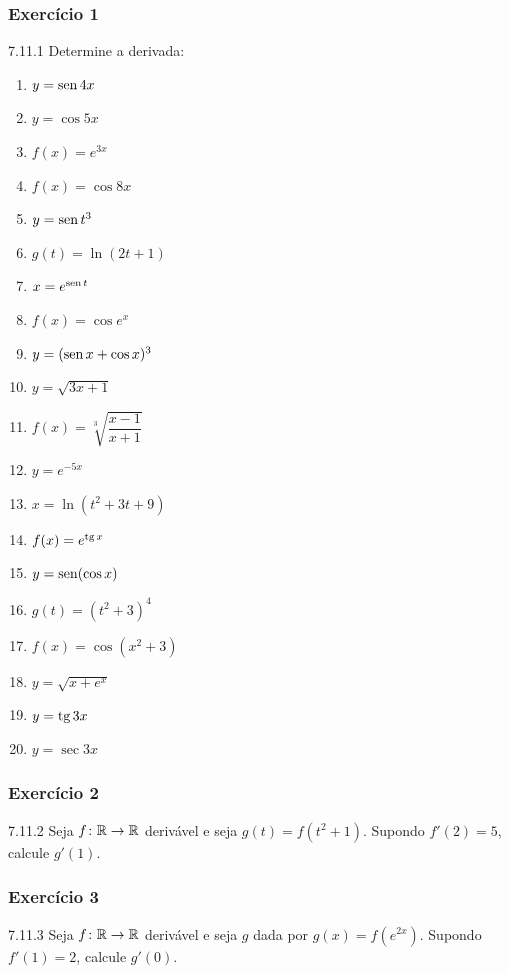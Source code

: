 \subsubsection*{Exercício 1}
\begin{exercicio}[1]{7.11.1}
Determine a derivada:
\begin{enumerate}[label=\alph*)]
    \item $y = \operatorname{sen} 4x$
    \item $y = \cos 5x$
    \item $f(x) = e^{3x}$
    \item $f(x) = \cos 8x$
    \item $y = \operatorname{sen} t^3$
    \item $g(t) = \ln(2t + 1)$
    \item $x = e^{\operatorname{sen} t}$
    \item $f(x) = \cos e^x$
    \item $y = (\operatorname{sen} x + \cos x)^3$
    \item $y = \sqrt{3x + 1}$
    \item $f(x) = \sqrt[3]{\dfrac{x - 1}{x + 1}}$
    \item $y = e^{-5x}$
    \item $x = \ln(t^2 + 3t + 9)$
    \item $f(x) = e^{\operatorname{tg} x}$
    \item $y = \operatorname{sen}(\cos x)$
    \item $g(t) = (t^2 + 3)^4$
    \item $f(x) = \cos(x^2 + 3)$
    \item $y = \sqrt{x + e^x}$
    \item $y = \operatorname{tg} 3x$
    \item $y = \sec 3x$
\end{enumerate}
\end{exercicio}

\subsubsection*{Exercício 2}
\begin{exercicio}[2]{7.11.2}
Seja $f\colon \mathbb{R} \to \mathbb{R}$ derivável e seja $g(t) = f(t^2 + 1)$. Supondo $f'(2) = 5$, calcule $g'(1)$.
\end{exercicio}

\subsubsection*{Exercício 3}
\begin{exercicio}[3]{7.11.3}
Seja $f\colon \mathbb{R} \to \mathbb{R}$ derivável e seja $g$ dada por $g(x) = f(e^{2x})$. Supondo $f'(1) = 2$, calcule $g'(0)$.
\end{exercicio}

